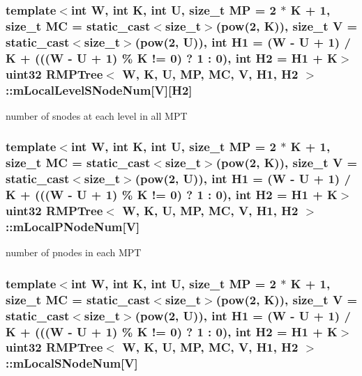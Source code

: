 \hypertarget{classRMPTree_a02dd259c17645662ea922afa6aa5959a}{
\subsubsection[{m\-Local\-Level\-S\-Node\-Num}]{\setlength{\rightskip}{0pt plus 5cm}template$<$int W, int K, int U, size\-\_\-t M\-P = 2 $\ast$ K + 1, size\-\_\-t M\-C = static\-\_\-cast$<$size\-\_\-t$>$(pow(2, K)), size\-\_\-t V = static\-\_\-cast$<$size\-\_\-t$>$(pow(2, U)), int H1 = (\-W -\/ U + 1) / K + (((\-W -\/ U + 1) \% K != 0) ? 1 \-: 0), int H2 = H1 + K$>$ {\bf uint32} {\bf R\-M\-P\-Tree}$<$ {\bf W}, K, U, M\-P, M\-C, V, H1, H2 $>$\-::m\-Local\-Level\-S\-Node\-Num\mbox{[}V\mbox{]}\mbox{[}H2\mbox{]}\hspace{0.3cm}{\ttfamily [private]}}}\label{classRMPTree_a02dd259c17645662ea922afa6aa5959a}


number of snodes at each level in all M\-P\-T 

\hypertarget{classRMPTree_a155ea8b9b340e1e108105062cfb2aa75}{
\subsubsection[{m\-Local\-P\-Node\-Num}]{\setlength{\rightskip}{0pt plus 5cm}template$<$int W, int K, int U, size\-\_\-t M\-P = 2 $\ast$ K + 1, size\-\_\-t M\-C = static\-\_\-cast$<$size\-\_\-t$>$(pow(2, K)), size\-\_\-t V = static\-\_\-cast$<$size\-\_\-t$>$(pow(2, U)), int H1 = (\-W -\/ U + 1) / K + (((\-W -\/ U + 1) \% K != 0) ? 1 \-: 0), int H2 = H1 + K$>$ {\bf uint32} {\bf R\-M\-P\-Tree}$<$ {\bf W}, K, U, M\-P, M\-C, V, H1, H2 $>$\-::m\-Local\-P\-Node\-Num\mbox{[}V\mbox{]}\hspace{0.3cm}{\ttfamily [private]}}}\label{classRMPTree_a155ea8b9b340e1e108105062cfb2aa75}


number of pnodes in each M\-P\-T 

\hypertarget{classRMPTree_a5662a149c9af51f1d0d470ee9b700a61}{
\subsubsection[{m\-Local\-S\-Node\-Num}]{\setlength{\rightskip}{0pt plus 5cm}template$<$int W, int K, int U, size\-\_\-t M\-P = 2 $\ast$ K + 1, size\-\_\-t M\-C = static\-\_\-cast$<$size\-\_\-t$>$(pow(2, K)), size\-\_\-t V = static\-\_\-cast$<$size\-\_\-t$>$(pow(2, U)), int H1 = (\-W -\/ U + 1) / K + (((\-W -\/ U + 1) \% K != 0) ? 1 \-: 0), int H2 = H1 + K$>$ {\bf uint32} {\bf R\-M\-P\-Tree}$<$ {\bf W}, K, U, M\-P, M\-C, V, H1, H2 $>$\-::m\-Local\-S\-Node\-Num\mbox{[}V\mbox{]}\hspace{0.3cm}{\ttfamily [private]}}}\label{classRMPTree_a5662a149c9af51f1d0d470ee9b700a61}



